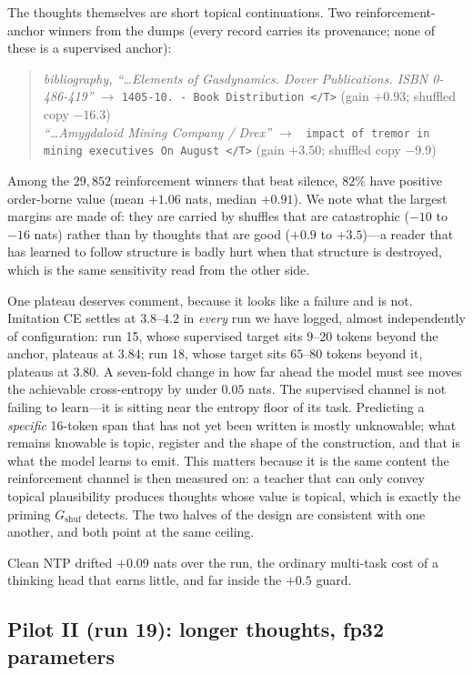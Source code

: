 \documentclass{article} %
\newcommand{\gain}{G}
\newcommand{\tend}{\texttt{</T>}}
\begin{document}
The thoughts themselves are short topical continuations. Two reinforcement-anchor winners from the dumps (every record carries its provenance; none of these is a supervised anchor):
\begin{quote}\small
\emph{bibliography, ``\ldots Elements of Gasdynamics. Dover Publications. ISBN 0-486-419''} $\to$ \texttt{1405-10. - Book Distribution \tend} \quad (gain $+0.93$; shuffled copy $-16.3$)\\
\emph{``\ldots Amygdaloid Mining Company / Drex''} $\to$ \texttt{ impact of tremor in mining executives On August \tend} \quad (gain $+3.50$; shuffled copy $-9.9$)
\end{quote}
Among the $29{,}852$ reinforcement winners that beat silence, $82\%$ have positive order-borne value (mean $+1.06$ nats, median $+0.91$). We note what the largest margins are made of: they are carried by shuffles that are catastrophic ($-10$ to $-16$ nats) rather than by thoughts that are good ($+0.9$ to $+3.5$)---a reader that has learned to follow structure is badly hurt when that structure is destroyed, which is the same sensitivity read from the other side.

One plateau deserves comment, because it looks like a failure and is not. Imitation CE settles at $3.8$--$4.2$ in \emph{every} run we have logged, almost independently of configuration: run 15, whose supervised target sits $9$--$20$ tokens beyond the anchor, plateaus at $3.84$; run 18, whose target sits $65$--$80$ tokens beyond it, plateaus at $3.80$. A seven-fold change in how far ahead the model must see moves the achievable cross-entropy by under $0.05$ nats. The supervised channel is not failing to learn---it is sitting near the entropy floor of its task. Predicting a \emph{specific} 16-token span that has not yet been written is mostly unknowable; what remains knowable is topic, register and the shape of the construction, and that is what the model learns to emit. This matters because it is the same content the reinforcement channel is then measured on: a teacher that can only convey topical plausibility produces thoughts whose value is topical, which is exactly the priming $\gain_{\mathrm{shuf}}$ detects. The two halves of the design are consistent with one another, and both point at the same ceiling.

Clean NTP drifted $+0.09$ nats over the run, the ordinary multi-task cost of a thinking head that earns little, and far inside the $+0.5$ guard.

\subsection{Pilot II (run 19): longer thoughts, fp32 parameters}
\label{sec:run19}
\end{document}
